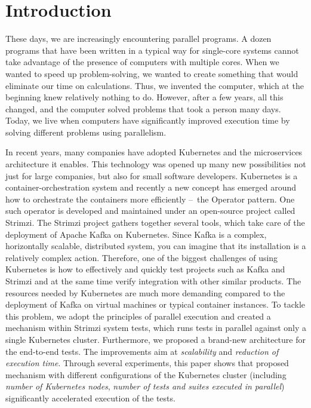 \chapter{Introduction}

These days, we are increasingly encountering parallel programs.
A dozen programs that have been written in a typical way for single-core systems cannot take advantage of the presence of computers with multiple cores.
When we wanted to speed up problem-solving, we wanted to create something that would eliminate our time on calculations.
Thus, we invented the computer, which at the beginning knew relatively nothing to do.
However, after a few years, all this changed, and the computer solved problems that took a person many days.
Today, we live when computers have significantly improved execution time by solving different problems using parallelism.

In recent years, many companies have adopted Kubernetes and the microservices architecture it enables.
This technology was opened up many new possibilities not just for large companies, but also for small software developers.
Kubernetes is a container-orchestration system and recently a new concept has emerged around how to orchestrate the containers more efficiently \---\ the Operator pattern.
One such operator is developed and maintained under an open-source project called Strimzi.
The Strimzi project gathers together several tools, which take care of the deployment of Apache Kafka on Kubernetes.
Since Kafka is a complex, horizontally scalable, distributed system, you can imagine that its installation is a relatively complex action.
Therefore, one of the biggest challenges of using Kubernetes is how to effectively and quickly test projects such as Kafka and Strimzi and at the same time verify integration with other similar products.
The resources needed by Kubernetes are much more demanding compared to the deployment of Kafka on virtual machines or typical container instances.
To tackle this problem, we adopt the principles of parallel execution and created a mechanism within Strimzi system tests, which runs tests in parallel against only a single Kubernetes cluster.
Furthermore, we proposed a brand-new architecture for the end-to-end tests.
The improvements aim at \textit{scalability} and \textit{reduction of execution time}.
Through several experiments, this paper shows that proposed mechanism with different configurations of the Kubernetes cluster (including \textit{number of Kubernetes nodes}, \textit{number of tests and suites executed in parallel}) significantly accelerated execution of the tests.

